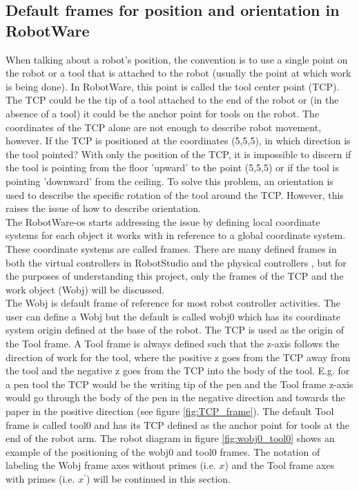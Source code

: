 \documentclass{cslthse-msc}
\begin{document}
\subsection{Default frames for position and orientation in RobotWare}
\label{sec:Tech_Back:Rob_Move:frames}
When talking about a robot's position, the convention is to use a single point on the robot or a tool that is attached to the robot (usually the point at which work is being done). In RobotWare, this point is called the tool center point (TCP). The TCP could be the tip of a tool attached to the end of the robot or (in the absence of a tool) it could be the anchor point for tools on the robot. The coordinates of the TCP alone are not enough to describe robot movement, however. If the TCP is positioned at the coordinates (5,5,5), in which direction is the tool pointed? With only the position of the TCP, it is impossible to discern if the tool is pointing from the floor 'upward' to the point (5,5,5) or if the tool is pointing 'downward' from the ceiling. To solve this problem, an orientation is used to describe the specific rotation of the tool around the TCP. However, this raises the issue of how to describe orientation.\\
The RobotWare-os starts addressing the issue by defining local coordinate systems for each object it works with in reference to a global coordinate system. These coordinate systems are called frames. There are many defined frames in both the virtual controllers in RobotStudio and the physical controllers \cite[Sec. 1.2.6]{ABB:robotstudio}, but for the purposes of understanding this project, only the frames of the TCP and the work object (Wobj) will be discussed.\\
The Wobj is default frame of reference for most robot controller activities. The user can define a Wobj but the default is called wobj0 which has its coordinate system origin defined at the base of the robot. The TCP is used as the origin of the Tool frame. A Tool frame is always defined such that the z-axis follows the direction of work for the tool, where the positive z goes from the TCP away from the tool and the negative z goes from the TCP into the body of the tool. E.g. for a pen tool the TCP would be the writing tip of the pen and the Tool frame z-axis would go through the body of the pen in the negative direction and towards the paper in the positive direction (see figure \ref{fig:TCP_frame}). The default Tool frame is called tool0 and has its TCP defined as the anchor point for tools at the end of the robot arm. The robot diagram in figure \ref{fig:wobj0_tool0} shows an example of the positioning of the wobj0 and tool0 frames. The notation of labeling the Wobj frame axes without primes (i.e. $x$) and the Tool frame axes with primes (i.e. $x^\prime$) will be continued in this section. 
\end{document}
